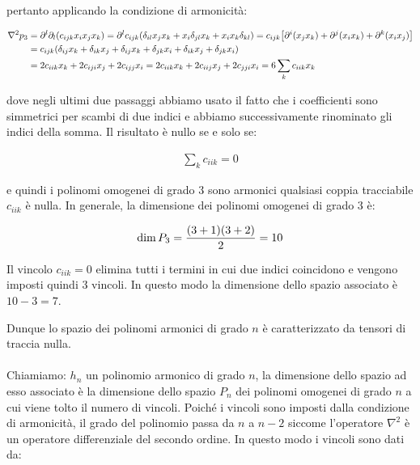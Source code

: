 \begin{itemize}
		pertanto applicando la condizione di armonicità:
		
	\begin{align*}
		\nabla^2 p_3 & = \partial^l \partial_l \qty( c_{ijk} x_i x_j x_k ) = \partial^l  c_{ijk} \qty( \delta_{il} x_j x_k + x_i \delta_{jl} x_k + x_i x_k \delta_{kl}  ) = c_{ijk} \qty[ \partial^i \qty(x_j x_k) + \partial^j \qty( x_i x_k ) + \partial^k \qty( x_i x_j)  ] \\
		& = c_{ijk} \qty( \delta_{ij} x_k + \delta_{ik} x_j + \delta_{ij} x_k + \delta_{jk} x_i + \delta_{ik} x_j + \delta_{jk} x_i)  \\
		& = 2 c_{iik} x_k + 2 c_{iji} x_j + 2 c_{ijj} x_i = 2 c_{iik} x_k + 2 c_{iij} x_j + 2 c_{jji} x_i = 6 \sum_k c_{iik} x_k
	\end{align*}

		dove negli ultimi due passaggi abbiamo usato il fatto che i coefficienti sono simmetrici per scambi di due indici e abbiamo successivamente rinominato gli indici della somma. Il risultato è nullo se e solo se:

	\begin{align*}
		\sum_k c_{iik} = 0
	\end{align*}
	
		 e quindi i polinomi omogenei di grado $3$ sono armonici qualsiasi coppia tracciabile $c_{iik}$ è nulla. In generale, la dimensione dei polinomi omogenei di grado $3$ è:
		 
	\begin{align*}
		\text{dim} \, P_3 = \frac{\qty(3+1) \qty(3+2)}{2} = 10
	\end{align*}
	
		Il vincolo $c_{iik} = 0$ elimina tutti i termini in cui due indici coincidono e vengono imposti quindi $3$ vincoli. In questo modo la dimensione dello spazio associato è $10 -3 = 7$.
		
\end{itemize}

	Dunque lo spazio dei polinomi armonici di grado $n$ è caratterizzato da tensori di traccia nulla. 
	\\
	\\
	Chiamiamo: $h_n$ un polinomio armonico di grado $n$, la dimensione dello spazio ad esso associato è la dimensione dello spazio $P_n$ dei polinomi omogenei di grado $n$ a cui viene tolto il numero di vincoli. Poiché i vincoli sono imposti dalla condizione di armonicità, il grado del polinomio passa da $n$ a $n-2$ siccome l'operatore $\nabla^2$ è un operatore differenziale del secondo ordine. In questo modo i vincoli sono dati da:
	
